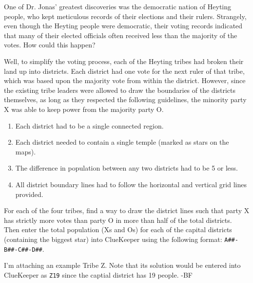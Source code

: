 One of Dr. Jonas' greatest discoveries was the democratic nation
of Heyting people, who kept meticulous records of their elections 
and their rulers.
Strangely, even though the Heyting people were democratic, 
their voting records indicated that many of their elected officials
often received less than the majority of the votes.
How could this happen?

Well, to simplify the voting process, each of the Heyting tribes had broken their 
land up into districts.
Each district had one vote for the next ruler of that tribe, which was based upon
the majority vote from within the district.
However, since the existing tribe leaders were allowed to draw the boundaries 
of the districts themselves, as long as they respected the following guidelines,
the minority party X was able to keep power from the majority party O.
\begin{enumerate}
\item Each district had to be a single connected region.
\item Each district needed to contain a single temple (marked as stars on the maps).
\item The difference in population between any two districts had to be 5 or less.
\item All district boundary lines had to follow the horizontal and vertical grid lines provided.
\end{enumerate}

For each of the four tribes, find a way to draw the district lines such that party X
has strictly more votes than party O in more than half of the total districts.
Then enter the total population (Xs and Os) for each of the capital districts (containing
the biggest star) into
ClueKeeper using the following format: \texttt{A\#\#-B\#\#-C\#\#-D\#\#}.

I'm attaching an example Tribe Z. Note that its solution would be entered into ClueKeeper as \texttt{Z19}
since the captial district has 19 people. -BF


